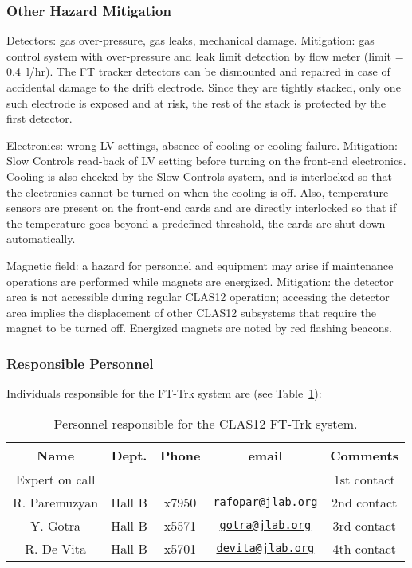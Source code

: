 \subsubsection{Other Hazard Mitigation}

Detectors: gas over-pressure, gas leaks, mechanical damage. Mitigation: gas control system with 
over-pressure and leak limit detection by flow meter (limit = 0.4~l/hr). The FT tracker detectors 
can be dismounted and repaired in case of accidental damage to the drift electrode. Since they are 
tightly stacked, only one such electrode is exposed and at risk, the rest of the stack is protected 
by the first detector.

Electronics: wrong LV settings, absence of cooling or cooling failure. Mitigation: Slow Controls 
read-back of LV setting before turning on the front-end electronics. Cooling is also checked by 
the Slow Controls system, and is interlocked so that the electronics cannot be turned on when the 
cooling is off. Also, temperature sensors are present on the front-end cards and are directly 
interlocked so that if the temperature goes beyond a predefined threshold, the cards are shut-down 
automatically.

Magnetic field: a hazard for personnel and equipment may arise if maintenance operations are 
performed while magnets are energized. Mitigation: the detector area is not accessible during 
regular CLAS12 operation; accessing the detector area implies the displacement of other CLAS12 
subsystems that require the magnet to be turned off. Energized magnets are noted by red flashing 
beacons.

\subsubsection{Responsible Personnel}

Individuals responsible for the FT-Trk system are (see Table~\ref{tb:ft-trk}):

\begin{table}[!htb]
\centering
\begin{tabular}{|c|c|c|c|c|} \hline
Name          & Dept.  & Phone & email & Comments \\ \hline
Expert on call&        &       &       & 1st contact \\ \hline
R. Paremuzyan & Hall B &x7950&\href{mailto:rafopar@jlab.org}{\nolinkurl{rafopar@jlab.org}}&2nd contact \\ \hline
Y. Gotra      & Hall B &x5571&\href{mailto:gotra@jlab.org}{\nolinkurl{gotra@jlab.org}}&3rd contact \\ \hline
R. De Vita    & Hall B &x5701&\href{mailto:devita@jlab.org}{\nolinkurl{devita@jlab.org}}&4th contact \\ \hline
\end{tabular}
\caption{Personnel responsible for the CLAS12 FT-Trk system.} 
\label{tb:ft-trk}
\end{table}
